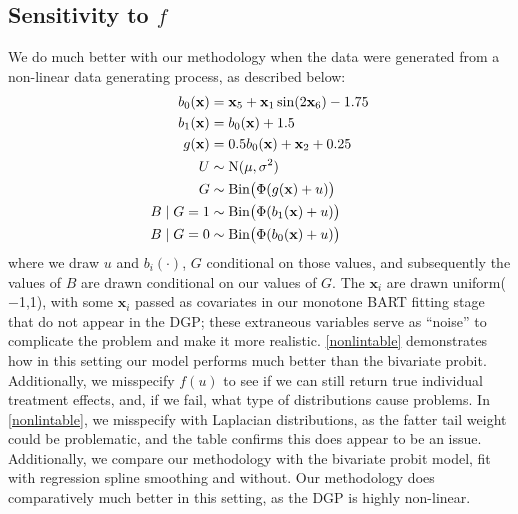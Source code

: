 \documentclass[aoas,preprint, 11pt, dvipsnames, table, x11name]{imsart}
\renewcommand{\bm}[1]{\mathbf{#1}}
\theoremstyle{remark}
\begin{document}
	
	
	\subsection{Sensitivity to $f$}\label{nonlindgp}
	
	We do much better with our methodology when the data were generated from a non-linear data generating process, as described below:
	\begin{align}
		\begin{split}
			b_0(\bm{x})&=\bm{x}_5+\bm{x}_1 \sin(2\bm{x}_6)-1.75\\
			b_1(\bm{x})&=b_0(\bm{x})+1.5\\
			g(\bm{x})&=0.5 b_0(\bm{x})+\bm{x}_2+0.25\\
			U&\sim \mbox{N}(\mu,\sigma^2)\\
			G&\sim \text{Bin}\qty(\Phi(g(\bm{x})+u)) \\
			B\mid G=1&\sim\text{Bin}\qty(\Phi(b_1(\bm{x})+u))\\
			B\mid G=0&\sim \text{Bin}\qty(\Phi(b_0(\bm{x})+u))
		\end{split}
		\label{newnonlinmodel}
	\end{align}
	where we draw $u$ and $b_i(\cdot)$, $G$ conditional on those values, and subsequently  the values of $B$ are drawn conditional on our values of $G$. The $\bm{x}_i$ are drawn uniform($-$1,1), with some $\bm{x}_i$ passed as covariates in our monotone BART fitting stage that do not appear in the DGP; these extraneous variables serve as ``noise'' to complicate the problem and make it more realistic.  \autoref{nonlintable} demonstrates how in this setting our model performs much better than the bivariate probit.
	Additionally, we misspecify $f(u)$ to see if we can still return true individual treatment effects, and, if we fail, what type of distributions cause problems.  In \autoref{nonlintable}, we misspecify with Laplacian distributions, as the fatter tail weight could be problematic, and the table confirms this does appear to be an issue.  Additionally, we compare our methodology with the bivariate probit model, fit with regression spline smoothing and without.  Our methodology does comparatively much better in this setting, as the DGP is highly non-linear. 
	
\end{document}
